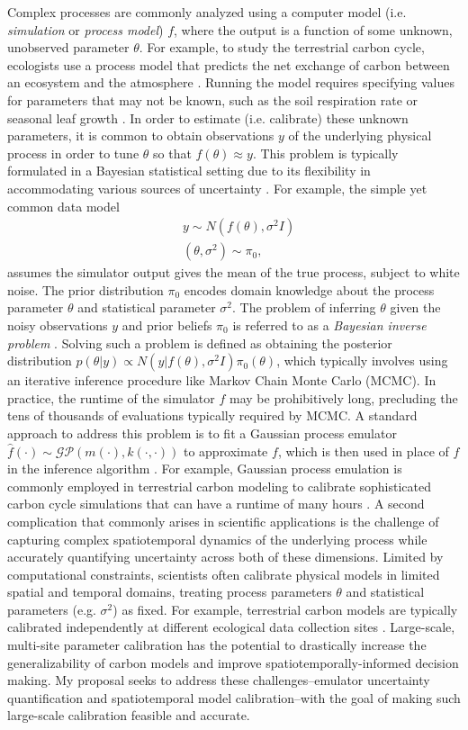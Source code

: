 \documentclass[12pt]{article}
\begin{document}
Complex processes are commonly analyzed using a computer model (i.e. \textit{simulation} or \textit{process model}) $f$, where the output is a function of some unknown, unobserved parameter $\theta$.
For example, to study the terrestrial carbon cycle, ecologists use a process model 
that predicts the net exchange of carbon between an ecosystem and the atmosphere \cite{Friedlingstein}. Running the model requires specifying values for parameters that 
may not be known, such as the soil respiration rate or seasonal leaf growth \cite{Fer}. In order to estimate (i.e. calibrate) these unknown parameters, it is common to obtain observations $y$ 
of the underlying physical process in order to tune $\theta$ so that $f(\theta) \approx y$. This problem is typically formulated in a Bayesian statistical setting due to its flexibility in accommodating
various sources of uncertainty \cite{Kennedy}. For example, the simple yet common data model\begin{align*}
&y \sim N(f(\theta), \sigma^2 I) \\
&(\theta, \sigma^2) \sim \pi_0,
\end{align*}
assumes the simulator output gives the mean of the true process, subject to white noise. The prior distribution $\pi_0$ encodes domain knowledge about the 
process parameter $\theta$ and statistical parameter $\sigma^2$. The problem of inferring $\theta$ given the noisy observations $y$ and prior beliefs $\pi_0$ is referred to as a \textit{Bayesian inverse problem} \cite{Stuart}. Solving such a problem is defined 
 as obtaining the posterior distribution $p(\theta|y) \propto N(y|f(\theta), \sigma^2 I)\pi_0(\theta)$, which typically involves using an iterative inference procedure like Markov Chain Monte Carlo (MCMC). In practice, the runtime of the simulator $f$ may be prohibitively long, precluding the tens of thousands of evaluations typically required by MCMC. A standard approach to address this problem is to fit a Gaussian process 
emulator $\hat{f}(\cdot) \sim \mathcal{GP}(m(\cdot), k(\cdot, \cdot))$ to approximate $f$, which is then used in place of $f$ in the inference algorithm \cite{Fer, Kennedy, Cleary}. For example, Gaussian process emulation is commonly employed in terrestrial carbon modeling to calibrate sophisticated carbon cycle simulations that can have a runtime of many hours \cite{Fer}. A second complication that commonly arises in scientific applications is the challenge of capturing complex spatiotemporal dynamics of the underlying process while accurately quantifying uncertainty across both of these dimensions. 
Limited by computational constraints, scientists often calibrate physical models in limited spatial and temporal domains, treating process parameters $\theta$ and statistical parameters (e.g. $\sigma^2$) as fixed. For example, terrestrial carbon models are typically calibrated independently at different ecological data collection sites \cite{Fer2}. Large-scale, multi-site parameter calibration has the potential to drastically increase the generalizability of carbon models and improve spatiotemporally-informed decision making. 
My proposal seeks to address these challenges--emulator uncertainty quantification and spatiotemporal model calibration--with the goal of making such large-scale calibration feasible and accurate. 
 
\end{document}
